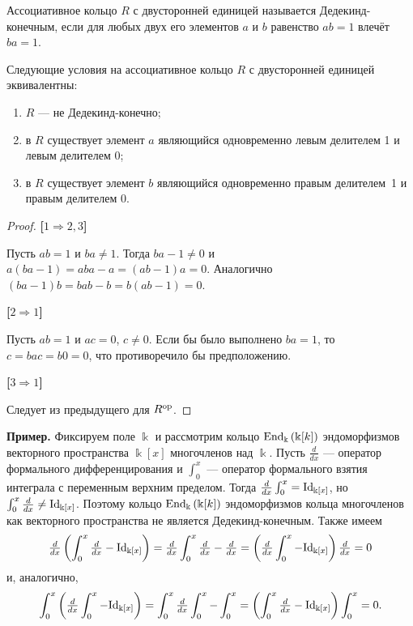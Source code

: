 
Ассоциативное кольцо $ R $ с двусторонней единицей называется \textcolor{defcolor}{Дедекинд-конечным}, если для любых двух его элементов $ a $ и $ b $ равенство $ ab = 1 $ влечёт $ ba = 1 $.

\begin{theorem}
	Следующие условия на ассоциативное кольцо $ R $ с двусторонней единицей эквивалентны:
	\begin{enumerate}
		\item $ R $ --- не Дедекинд-конечно;
		\item в $ R $ существует элемент $ a $ являющийся одновременно левым делителем 1 и левым делителем 0;
		\item в $ R $ существует элемент $ b $ являющийся одновременно правым делителем~1 и правым делителем 0.
	\end{enumerate}
\end{theorem}

\begin{proof}
	\hfill
	
	\textbf{[$ 1 \Rightarrow 2, 3 $]}
	
	Пусть $ ab = 1 $ и $ ba \neq 1 $.
	Тогда $ ba - 1 \neq 0 $ и $ a(ba - 1) = aba - a = (ab - 1)a = 0 $.
	Аналогично $ (ba - 1)b = bab - b = b(ab - 1) = 0 $.
	
	\textbf{[$ 2 \Rightarrow 1 $]}
	
	Пусть $ ab = 1 $ и $ ac = 0 $, $ c \neq 0 $.
	Если бы было выполнено $ ba = 1 $, то $ c =  bac = b0 = 0 $, что противоречило бы предположению.
	
	\textbf{[$ 3 \Rightarrow 1 $]}
	
	Следует из предыдущего для $ R^{\mathrm{op}} $.
	
\end{proof}

\textbf{Пример.} Фиксируем поле $ \Bbbk $ и рассмотрим кольцо $ \mathrm{End}_{\Bbbk}\left(\Bbbk[k]\right) $ эндоморфизмов векторного пространства $ \Bbbk[x] $ многочленов над $ \Bbbk $. 
Пусть $ \tfrac{d}{dx} $ --- оператор формального дифференцирования 
и $ \int_{0}^{x} $ --- оператор формального взятия интеграла с переменным верхним пределом.
Тогда $ \tfrac{d}{dx} \int_{0}^{x} = \mathrm{Id}_{\Bbbk[x]} $, но $ \int_{0}^{x} \tfrac{d}{dx} \neq \mathrm{Id}_{\Bbbk[x]} $.
Поэтому кольцо $ \mathrm{End}_{\Bbbk}\left(\Bbbk[k]\right) $ эндоморфизмов кольца многочленов как векторного пространства
не является Дедекинд-конечным.
Также имеем 
$$ \tfrac{d}{dx}\left(\int_{0}^{x} \tfrac{d}{dx} - \mathrm{Id}_{\Bbbk[x]} \right) =
\tfrac{d}{dx} \int_{0}^{x} \tfrac{d}{dx} - \tfrac{d}{dx} = 
\left(\tfrac{d}{dx} \int_{0}^{x} - \mathrm{Id}_{\Bbbk[x]}\right)\tfrac{d}{dx} = 0 $$
и, аналогично,
$$ \int_{0}^{x}\left(\tfrac{d}{dx} \int_{0}^{x} - \mathrm{Id}_{\Bbbk[x]} \right) =
\int_{0}^{x}\tfrac{d}{dx} \int_{0}^{x} - \int_{0}^{x} = 
\left(\int_{0}^{x}\tfrac{d}{dx} - \mathrm{Id}_{\Bbbk[x]}\right)\int_{0}^{x} = 0. $$

